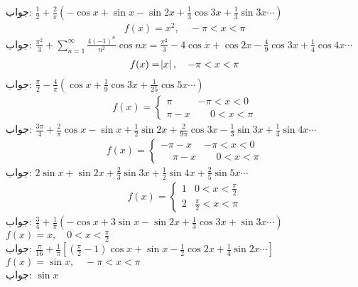 جواب:\quad 
$\tfrac{1}{2}+\tfrac{2}{\pi}(-\cos x+\sin x-\sin 2x+\tfrac{1}{3}\cos 3x+\tfrac{1}{3}\sin 3x\cdots)$
\begin{align*}
f(x)=x^2,\quad -\pi<x<\pi
\end{align*}
جواب:\quad
$\tfrac{\pi^2}{3}+\sum\limits_{n=1}^{\infty}\tfrac{4(-1)^n}{n^2}\cos nx=\tfrac{\pi^2}{3}-4\cos x+\cos 2x-\tfrac{4}{9}\cos 3x+\tfrac{1}{4}\cos 4x\cdots$
\begin{align*}
f(x)=\abs{x},\quad -\pi<x<\pi
\end{align*}
جواب:\quad
$\tfrac{\pi}{2}-\tfrac{4}{\pi}(\cos x+\tfrac{1}{9}\cos 3x+\tfrac{1}{25}\cos 5x\cdots)$
\begin{align*}
f(x)=
\begin{cases}
\pi & -\pi<x<0\\
\pi-x&\phantom{-}0<x<\pi
\end{cases}
\end{align*}
جواب:\quad
$\tfrac{3\pi}{4}+\tfrac{2}{\pi}\cos x-\sin x+\tfrac{1}{2}\sin 2x+\tfrac{2}{9\pi}\cos 3x-\tfrac{1}{3}\sin 3x+\tfrac{1}{4}\sin 4x\cdots$
\begin{align*}
f(x)=
\begin{cases}
-\pi-x & -\pi<x<0\\
\phantom{-}\pi-x&\phantom{-}0<x<\pi
\end{cases}
\end{align*}
جواب:\quad
$2\sin x+\sin 2x+\tfrac{2}{3}\sin 3x+\tfrac{1}{2}\sin 4x+\tfrac{2}{5}\sin 5x\cdots$
\begin{align*}
f(x)=
\begin{cases}
1& 0<x<\frac{\pi}{2}\\
2&\frac{\pi}{2}<x<\pi
\end{cases}
\end{align*}
جواب:\quad
$\tfrac{3}{4}+\tfrac{1}{\pi}(-\cos x+3\sin x-\sin 2x+\tfrac{1}{3}\cos 3x+\sin 3x\cdots)$
\quad
$f(x)=x,\quad  0<x<\frac{\pi}{2}$\\
جواب:\quad
$\tfrac{\pi}{16}+\tfrac{1}{\pi}[(\tfrac{\pi}{2}-1)\cos x+\sin x-\tfrac{1}{2}\cos 2x+\tfrac{1}{4}\sin 2x\cdots]$
\quad
$f(x)=\sin x,\quad -\pi<x<\pi$\\
جواب:\quad
$\sin x$
